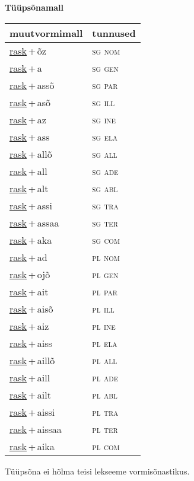 
\vspace{1.8em}
\begin{minipage}{\textwidth}
\textbf{Tüüpsõnamall \,}\\

\begin{sideways}
\begin{tabular}{l l}
muutvormimall & tunnused \\
\hline
\underline{rask}\,+\,õz & \textsc{ sg nom } \\
\underline{rask}\,+\,a & \textsc{ sg gen } \\
\underline{rask}\,+\,assõ & \textsc{ sg par } \\
\underline{rask}\,+\,asõ & \textsc{ sg ill } \\
\underline{rask}\,+\,az & \textsc{ sg ine } \\
\underline{rask}\,+\,ass & \textsc{ sg ela } \\
\underline{rask}\,+\,allõ & \textsc{ sg all } \\
\underline{rask}\,+\,all & \textsc{ sg ade } \\
\underline{rask}\,+\,alt & \textsc{ sg abl } \\
\underline{rask}\,+\,assi & \textsc{ sg tra } \\
\underline{rask}\,+\,assaa & \textsc{ sg ter } \\
\underline{rask}\,+\,aka & \textsc{ sg com } \\
\underline{rask}\,+\,ad & \textsc{ pl nom } \\
\underline{rask}\,+\,ojõ & \textsc{ pl gen } \\
\underline{rask}\,+\,ait & \textsc{ pl par } \\
\underline{rask}\,+\,aisõ & \textsc{ pl ill } \\
\underline{rask}\,+\,aiz & \textsc{ pl ine } \\
\underline{rask}\,+\,aiss & \textsc{ pl ela } \\
\underline{rask}\,+\,aillõ & \textsc{ pl all } \\
\underline{rask}\,+\,aill & \textsc{ pl ade } \\
\underline{rask}\,+\,ailt & \textsc{ pl abl } \\
\underline{rask}\,+\,aissi & \textsc{ pl tra } \\
\underline{rask}\,+\,aissaa & \textsc{ pl ter } \\
\underline{rask}\,+\,aika & \textsc{ pl com } \\
\end{tabular}
\end{sideways}
\label{tab:tüüpsõnamall-raskõz}

\end{minipage}

 
\vspace{1em}
\noindent Tüüpsõna ei hõlma teisi lekseeme vormi\-sõnastikus.
